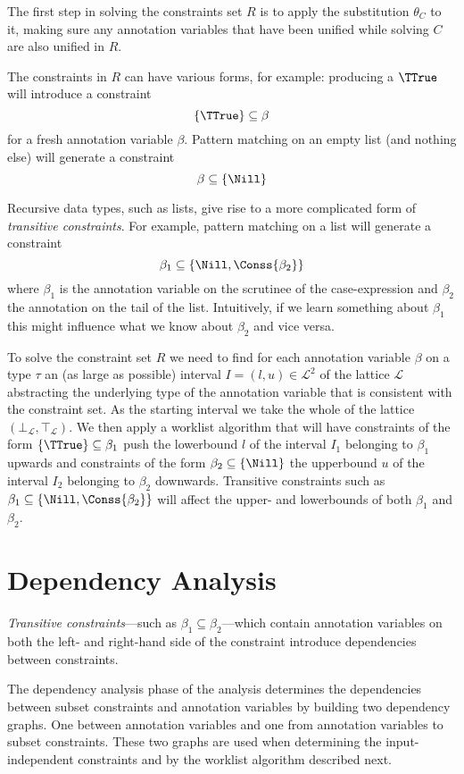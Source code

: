 The first step in solving the constraints set $R$ is to apply the substitution $\theta_C$ to it, making sure any annotation variables that have been unified while solving $C$ are also unified in $R$.

The constraints in $R$ can have various forms, for example: producing a $\TTrue$ will introduce a constraint \[ \{\TTrue\} \subseteq \beta \] for a fresh annotation variable $\beta$. Pattern matching on an empty list (and nothing else) will generate a constraint \[ \beta \subseteq \{\Nill\} \]

Recursive data types, such as lists, give rise to a more complicated form of \emph{transitive constraints}. For example, pattern matching on a list will generate a constraint \[ \beta_1 \subseteq \{\Nill, \Conss{\beta_2}\} \] where $\beta_1$ is the annotation variable on the scrutinee of the case-expression and $\beta_2$ the annotation on the tail of the list. Intuitively, if we learn something about $\beta_1$ this might influence what we know about $\beta_2$ and vice versa.

To solve the constraint set $R$ we need to find for each annotation variable $\beta$ on a type $\tau$ an (as large as possible) interval $I = (l, u) \in \mathcal{L}^2$ of the lattice $\mathcal{L}$ abstracting the underlying type of the annotation variable that is consistent with the constraint set. As the starting interval we take the whole of the lattice $(\bot_\mathcal{L}, \top_\mathcal{L})$. We then apply a worklist algorithm that will have constraints of the form $\{\TTrue\} \subseteq \beta_1$ push the lowerbound $l$ of the interval $I_1$ belonging to $\beta_1$ upwards and constraints of the form $\beta_2 \subseteq \{\Nill\}$ the upperbound $u$ of the interval $I_2$ belonging to $\beta_2$ downwards. Transitive constraints such as $\beta_1 \subseteq \{\Nill, \Conss{\beta_2}\}$ will affect the upper- and lowerbounds of both $\beta_1$ and $\beta_2$.

\section{Dependency Analysis}\label{depanal}

\emph{Transitive constraints}---such as $\beta_1 \subseteq \beta_2$---which contain annotation variables on both the left- and right-hand side of the constraint introduce dependencies between constraints.

The dependency analysis phase of the analysis determines the dependencies between subset constraints and annotation variables by building two dependency graphs. One between annotation variables and one from annotation variables to subset constraints. These two graphs are used when determining the input-independent constraints and by the worklist algorithm described next.

